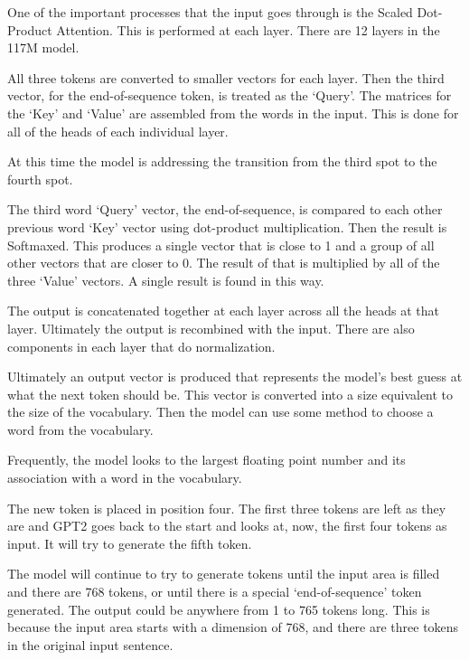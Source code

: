 One of the important processes that the input goes through is the Scaled Dot-Product Attention. This is performed at each layer. There are 12 layers in the 117M model.

All three tokens are converted to smaller vectors for each layer. Then the third vector, for the end-of-sequence token, is treated as the `Query'. The matrices for the `Key' and `Value' are assembled from the words in the input. This is done for all of the heads of each individual layer.

At this time the model is addressing the transition from the third spot to the fourth spot.

The third word `Query' vector, the end-of-sequence, is compared to each other previous word `Key' vector using dot-product multiplication. Then the result is Softmaxed. This produces a single vector that is close to 1 and a group of all other vectors that are closer to 0. The result of that is multiplied by all of the three `Value' vectors. A single result is found in this way.

The output is concatenated together at each layer across all the heads at that layer. Ultimately the output is recombined with the input. There are also components in each layer that do normalization.

Ultimately an output vector is produced that represents the model's best guess at what the next token should be. This vector is converted into a size equivalent to the size of the vocabulary. Then the model can use some method to choose a word from the vocabulary. 

Frequently, the model looks to the largest floating point number and its association with a word in the vocabulary.

The new token is placed in position four. The first three tokens are left as they are and GPT2 goes back to the start and looks at, now, the first four tokens as input. It will try to generate the fifth token.

The model will continue to try to generate tokens until the input area is filled and there are 768 tokens, or until there is a special `end-of-sequence' token generated. The output could be anywhere from 1 to 765 tokens long. This is because the input area starts with a dimension of 768, and there are three tokens in the original input sentence.


